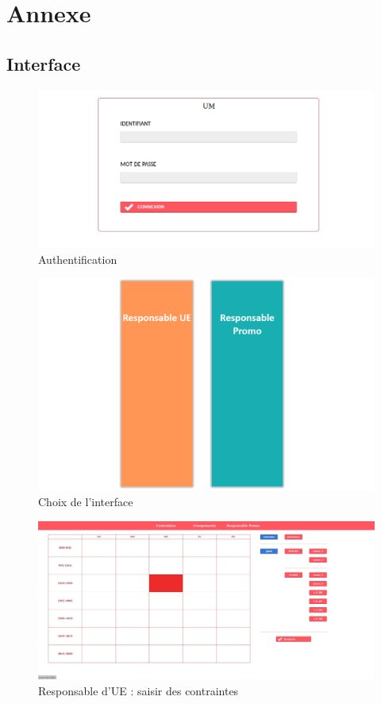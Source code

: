 \documentclass[12pt,a4paper,openany]{memoir}
\begin{document}
\chapter{Annexe} 
\section{Interface}
\begin{figure}[H]
    \includegraphics[width=19cm, center]{img/annexe/auth.png}
    \caption{Authentification} \medbreak
\end{figure}

\begin{figure}[H]
    \includegraphics[width=19cm, center]{img/annexe/auth2.png}
    \caption{Choix de l'interface} \medbreak
\end{figure}

\begin{figure}[H]
    \includegraphics[width=19cm, center]{img/annexe/contrainte.png}
    \caption{Responsable d'UE : saisir des contraintes} \medbreak
\end{figure}
\end{document}
